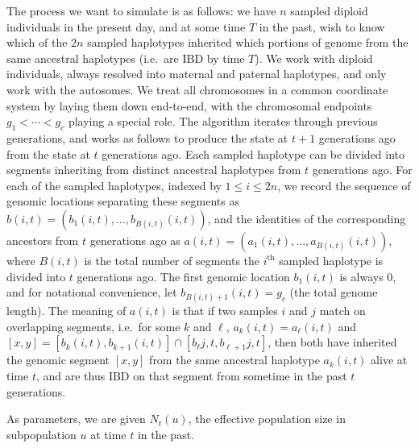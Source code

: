 \documentclass{article}
\begin{document}
The process we want to simulate is as follows:
we have $n$ sampled diploid individuals in the present day,
and at some time $T$ in the past, wish to know which of the $2n$ sampled haplotypes
inherited which portions of genome from the same ancestral haplotypes (i.e.\ are IBD by time $T$).
We work with diploid individuals, always resolved into maternal and paternal haplotypes, and only work with the autosomes.
We treat all chromosomes in a common coordinate system by laying them down end-to-end,
with the chromosomal endpoints $g_1 < \cdots < g_c$ playing a special role.
The algorithm iterates through previous generations,
and works as follows to produce the state at $t+1$ generations ago from the state at $t$ generations ago.
Each sampled haplotype can be divided into segments inheriting from distinct ancestral haplotypes from $t$ generations ago.
For each of the sampled haplotypes, indexed by $1 \le i \le 2n$,
we record the sequence of genomic locations separating these segments as $b(i,t) = (b_1(i,t), \ldots, b_{B(i,t)}(i,t))$, 
and the identities of the corresponding ancestors from $t$ generations ago as $a(i,t) = (a_1(i,t), \ldots, a_{B(i,t)}(i,t))$,
where $B(i,t)$ is the total number of segments the $i^\mathrm{th}$ sampled haplotype is divided into $t$ generations ago.
The first genomic location $b_1(i,t)$ is always 0, and for notational convenience, let $b_{B(i,t)+1}(i,t) = g_c$ (the total genome length).
The meaning of $a(i,t)$ is that if two samples $i$ and $j$ match on overlapping segments,
i.e.\ for some $k$ and $\ell$, $a_k(i,t) = a_\ell(i,t)$ and $[x,y] = [b_k(i,t),b_{k+1}(i,t)] \cap [b_{\ell}{j,t},b_{\ell+1}{j,t}]$, 
then both have inherited the genomic segment $[x,y]$ from the same ancestral haplotype $a_k(i,t)$ alive at time $t$,
and are thus IBD on that segment from sometime in the past $t$ generations.

As parameters, we are given $N_t(u)$, the effective population size in subpopulation $u$ at time $t$ in the past.
\end{document}
